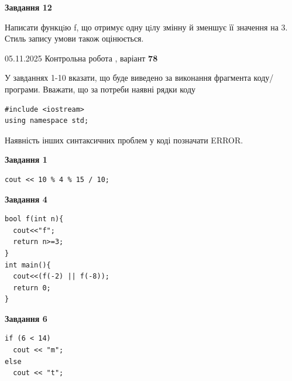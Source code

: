 \documentclass[12pt, ukrainian]{article}
\begin{document}
{\begin {large}
\begin{minipage}[t]{11.0cm}
\begin{center}
\textbf{Завдання 12}
\end{center}

Написати функцiю f, що отримує одну цiлу змінну й зменшує її значення на 3. Стиль запису умови також оцінюється.\par

\end{minipage}

\end {large}}
\newpage

{\Large{05.11.2025 Контрольна робота , варіант  \No \textbf { 78 }\par}}
{
\begin {large}
У завданнях 1-10 вказати, що буде виведено за виконання фрагмента коду/про\-гра\-ми.
Вважати, що за потреби наявні рядки коду
\begin{verbatim}
#include <iostream>
using namespace std;
\end{verbatim}
Наявність інших синтаксичних проблем у коді позначати ERROR.

\begin{minipage}[t]{7.0cm}

\begin{center}
\textbf{Завдання 1}
\end{center}
\vspace{-8mm}

\begin{verbatim}
cout << 10 % 4 % 15 / 10;
\end{verbatim}



\begin{center}
\textbf{Завдання 4}
\end{center}
\vspace{-8mm}

\begin{verbatim}
bool f(int n){
  cout<<"f";
  return n>=3;
}
int main(){
  cout<<(f(-2) || f(-8));
  return 0;
}
\end{verbatim}



\begin{center}
\textbf{Завдання 6}
\end{center}
\vspace{-8mm}

\begin{verbatim}
if (6 < 14)
  cout << "m";
else
  cout << "t";
\end{verbatim}




\end{minipage}
\end{large}}
\end{document}

